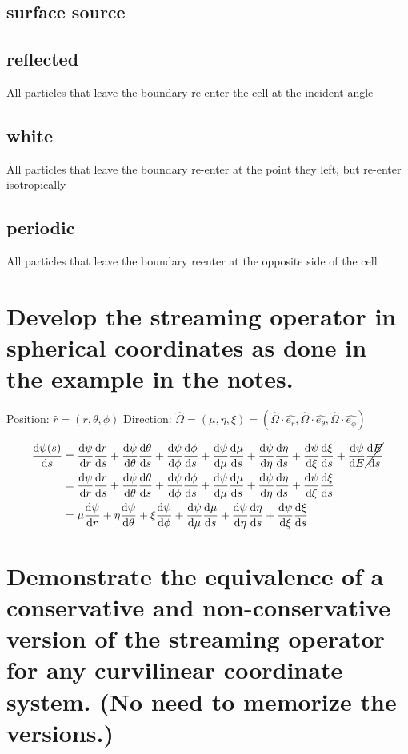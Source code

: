 \documentclass{article}
\begin{document}
\subsection{surface source}

\subsection{reflected}
All particles that leave the boundary re-enter the cell at the incident angle

\subsection{white}
All particles that leave the boundary re-enter at the point they left, but re-enter isotropically

\subsection{periodic}
All particles that leave the boundary reenter at the opposite side of the cell

\newpage
\section{Develop the streaming operator in spherical coordinates as done in the example in the notes.}

Position: $\hat{r} = (r, \theta, \phi)$
Direction: $\hat{\Omega} = (\mu, \eta, \xi) = (\hat{\Omega} \cdot \hat{e_r}, \hat{\Omega} \cdot \hat{e_\theta}, \hat{\Omega} \cdot \hat{e_\phi})$

\begin{align*}
\dv{\psi(s)}{s} &= \dv{\psi}{r} \dv{r}{s} + \dv{\psi}{\theta} \dv{\theta}{s} + \dv{\psi}{\phi} \dv{\phi}{s} + \dv{\psi}{\mu} \dv{\mu}{s} + \dv{\psi}{\eta} \dv{\eta}{s} + \dv{\psi}{\xi} \dv{\xi}{s} + \dv{\psi}{E} \cancel{\dv{E}{s}} \\
&= \dv{\psi}{r} \dv{r}{s} + \dv{\psi}{\theta} \dv{\theta}{s} + \dv{\psi}{\phi} \dv{\phi}{s} + \dv{\psi}{\mu} \dv{\mu}{s} + \dv{\psi}{\eta} \dv{\eta}{s} + \dv{\psi}{\xi} \dv{\xi}{s} \\
&= \mu \dv{\psi}{r} + \eta \dv{\psi}{\theta} + \xi \dv{\psi}{\phi} + \dv{\psi}{\mu} \dv{\mu}{s} + \dv{\psi}{\eta} \dv{\eta}{s} + \dv{\psi}{\xi} \dv{\xi}{s} 
\end{align*}

\newpage
\section{Demonstrate the equivalence of a conservative and non-conservative version of the streaming operator for any curvilinear coordinate system. (No need to memorize the versions.)}
\end{document}
